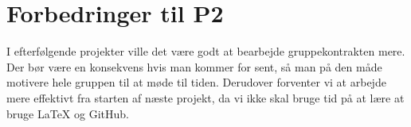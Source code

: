 \section{Forbedringer til P2}

I efterfølgende projekter ville det være godt at bearbejde gruppekontrakten mere. Der bør være en konsekvens hvis man kommer for sent, så man på den måde motivere hele gruppen til at møde til tiden. Derudover forventer vi at arbejde mere effektivt fra starten af næste projekt, da vi ikke skal bruge tid på at lære at bruge \LaTeX{} og GitHub.
